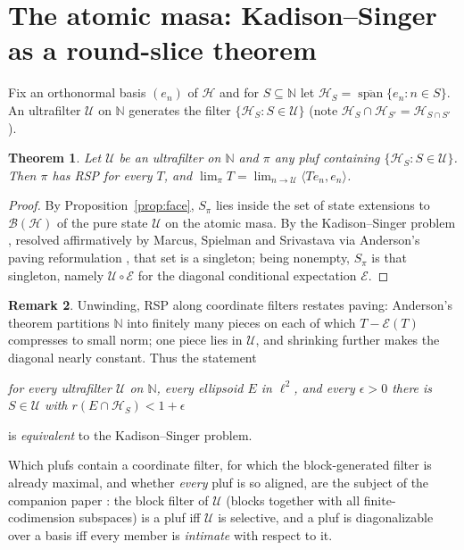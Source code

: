 \documentclass[11pt,reqno]{amsart}
\newtheorem{theorem}{Theorem}[section]
\theoremstyle{definition}
\newtheorem{remark}[theorem]{Remark}
\newcommand{\HH}{\mathcal{H}}
\newcommand{\BH}{\mathcal{B}(\HH)}
\newcommand{\N}{\mathbb{N}}
\newcommand{\pluf}{\pi}
\begin{document}
\section{The atomic masa: Kadison--Singer as a round-slice theorem}\label{sec:pos}

Fix an orthonormal basis $(e_n)$ of $\HH$ and for $S\subseteq\N$ let
$\HH_S=\overline{\operatorname{span}}\{e_n:n\in S\}$. An ultrafilter $\mathcal U$ on $\N$
generates the filter $\{\HH_S:S\in\mathcal U\}$ (note
$\HH_S\cap\HH_{S'}=\HH_{S\cap S'}$).

\begin{theorem}\label{thm:MSS}
Let $\mathcal U$ be an ultrafilter on $\N$ and $\pluf$ any pluf containing
$\{\HH_S:S\in\mathcal U\}$. Then $\pluf$ has RSP for every $T$, and
$\lim_\pluf T=\lim_{n\to\mathcal U}\langle Te_n,e_n\rangle$.
\end{theorem}

\begin{proof}
By Proposition~\ref{prop:face}, $S_\pluf$ lies inside the set of state extensions to
$\BH$ of the pure state $\mathcal U$ on the atomic masa. By the Kadison--Singer problem
\cite{KadisonSinger}, resolved affirmatively by Marcus, Spielman and Srivastava
\cite{MSS} via Anderson's paving reformulation \cite{Anderson79}, that set is a
singleton; being nonempty, $S_\pluf$ is that singleton, namely
$\mathcal U\circ\mathcal E$ for the diagonal conditional expectation $\mathcal E$.
\end{proof}

\begin{remark}\label{rem:KSpackage}
Unwinding, RSP along coordinate filters restates paving: Anderson's theorem partitions
$\N$ into finitely many pieces on each of which $T-\mathcal E(T)$ compresses to small
norm; one piece lies in $\mathcal U$, and shrinking further makes the diagonal nearly
constant. Thus the statement
\begin{center}
\emph{for every ultrafilter $\mathcal U$ on $\N$, every ellipsoid $E$ in $\ell^2$, and
every $\epsilon>0$ there is $S\in\mathcal U$ with $r(E\cap\HH_S)<1+\epsilon$}
\end{center}
is \emph{equivalent} to the Kadison--Singer problem.
\end{remark}

Which plufs contain a coordinate filter, for which the block-generated filter is already
maximal, and whether \emph{every} pluf is so aligned, are the subject of the companion
paper \cite{FWII}: the block filter of $\mathcal U$ (blocks together with all
finite-codimension subspaces) is a pluf iff $\mathcal U$ is selective, and a pluf is
diagonalizable over a basis iff every member is \emph{intimate} with respect to it.
\end{document}
